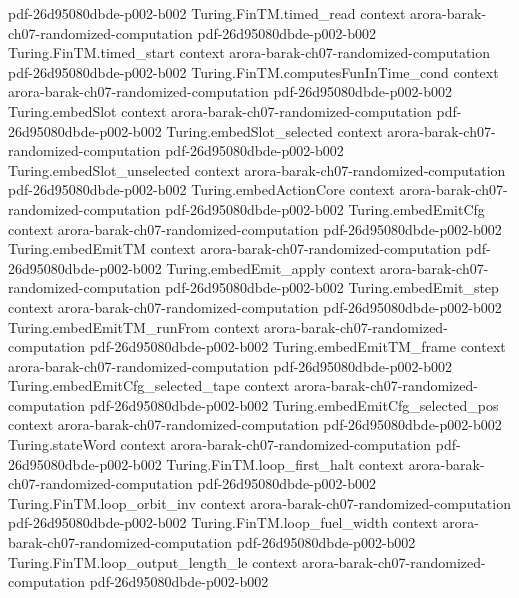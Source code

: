 \begin{theorem}
  {pdf-26d95080dbde-p002-b002}
\proofstep
  {Turing.FinTM.timed_read}
  {context}
  {arora-barak-ch07-randomized-computation}
  {pdf-26d95080dbde-p002-b002}
\proofstep
  {Turing.FinTM.timed_start}
  {context}
  {arora-barak-ch07-randomized-computation}
  {pdf-26d95080dbde-p002-b002}
\proofstep
  {Turing.FinTM.computesFunInTime_cond}
  {context}
  {arora-barak-ch07-randomized-computation}
  {pdf-26d95080dbde-p002-b002}
\proofstep
  {Turing.embedSlot}
  {context}
  {arora-barak-ch07-randomized-computation}
  {pdf-26d95080dbde-p002-b002}
\proofstep
  {Turing.embedSlot_selected}
  {context}
  {arora-barak-ch07-randomized-computation}
  {pdf-26d95080dbde-p002-b002}
\proofstep
  {Turing.embedSlot_unselected}
  {context}
  {arora-barak-ch07-randomized-computation}
  {pdf-26d95080dbde-p002-b002}
\proofstep
  {Turing.embedActionCore}
  {context}
  {arora-barak-ch07-randomized-computation}
  {pdf-26d95080dbde-p002-b002}
\proofstep
  {Turing.embedEmitCfg}
  {context}
  {arora-barak-ch07-randomized-computation}
  {pdf-26d95080dbde-p002-b002}
\proofstep
  {Turing.embedEmitTM}
  {context}
  {arora-barak-ch07-randomized-computation}
  {pdf-26d95080dbde-p002-b002}
\proofstep
  {Turing.embedEmit_apply}
  {context}
  {arora-barak-ch07-randomized-computation}
  {pdf-26d95080dbde-p002-b002}
\proofstep
  {Turing.embedEmit_step}
  {context}
  {arora-barak-ch07-randomized-computation}
  {pdf-26d95080dbde-p002-b002}
\proofstep
  {Turing.embedEmitTM_runFrom}
  {context}
  {arora-barak-ch07-randomized-computation}
  {pdf-26d95080dbde-p002-b002}
\proofstep
  {Turing.embedEmitTM_frame}
  {context}
  {arora-barak-ch07-randomized-computation}
  {pdf-26d95080dbde-p002-b002}
\proofstep
  {Turing.embedEmitCfg_selected_tape}
  {context}
  {arora-barak-ch07-randomized-computation}
  {pdf-26d95080dbde-p002-b002}
\proofstep
  {Turing.embedEmitCfg_selected_pos}
  {context}
  {arora-barak-ch07-randomized-computation}
  {pdf-26d95080dbde-p002-b002}
\proofstep
  {Turing.stateWord}
  {context}
  {arora-barak-ch07-randomized-computation}
  {pdf-26d95080dbde-p002-b002}
\proofstep
  {Turing.FinTM.loop_first_halt}
  {context}
  {arora-barak-ch07-randomized-computation}
  {pdf-26d95080dbde-p002-b002}
\proofstep
  {Turing.FinTM.loop_orbit_inv}
  {context}
  {arora-barak-ch07-randomized-computation}
  {pdf-26d95080dbde-p002-b002}
\proofstep
  {Turing.FinTM.loop_fuel_width}
  {context}
  {arora-barak-ch07-randomized-computation}
  {pdf-26d95080dbde-p002-b002}
\proofstep
  {Turing.FinTM.loop_output_length_le}
  {context}
  {arora-barak-ch07-randomized-computation}
  {pdf-26d95080dbde-p002-b002}
\proofstep

\end{theorem}
